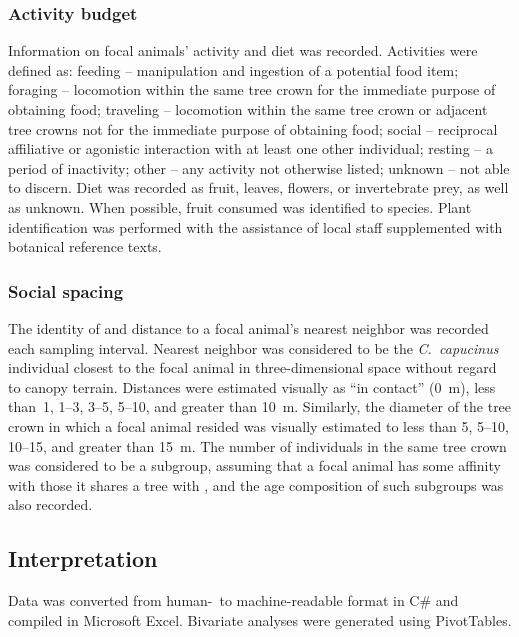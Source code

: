 \documentclass[american]{../../../coursework}
\begin{document}
\subsubsection{Activity budget}

Information on focal animals' activity and diet was recorded. Activities were
defined as: feeding -- manipulation and ingestion of a potential food item;
foraging -- locomotion within the same tree crown for the immediate purpose of
obtaining food; traveling -- locomotion within the same tree crown or adjacent
tree crowns not for the immediate purpose of obtaining food; social --
reciprocal affiliative or agonistic interaction with at least one other
individual; resting -- a period of inactivity; other -- any activity not
otherwise listed; unknown -- not able to discern. Diet was recorded as fruit,
leaves, flowers, or invertebrate prey, as well as unknown. When possible,
fruit consumed was identified to species. Plant identification was performed
with the assistance of local staff supplemented with botanical reference texts.

\subsubsection{Social spacing}

The identity of and distance to a focal animal's nearest
neighbor was recorded each sampling interval. Nearest neighbor was considered
to be the \emph{C.~capucinus} individual closest to the focal animal in
three-dimensional space without regard to canopy terrain. Distances were
estimated visually as ``in contact'' (\SI{0}{\metre}), less than~1,
\numrange{1}{3}, \numrange{3}{5}, \numrange{5}{10}, and greater than
\SI{10}{\metre}. Similarly, the diameter of the tree crown in which a focal
animal resided was visually estimated to less than 5, \numrange{5}{10},
\numrange{10}{15}, and greater than \SI{15}{\metre}. The number of individuals
in the same tree crown was considered to be a subgroup, assuming that a focal
animal has some affinity with those it shares a tree with
\parencite{Bezanson2008}, and the age composition of such subgroups was also
recorded.

\subsection{Interpretation}

Data was converted from human-\ to machine-readable format in C\# and compiled
in Microsoft Excel. Bivariate analyses were generated using PivotTables.
\end{document}
